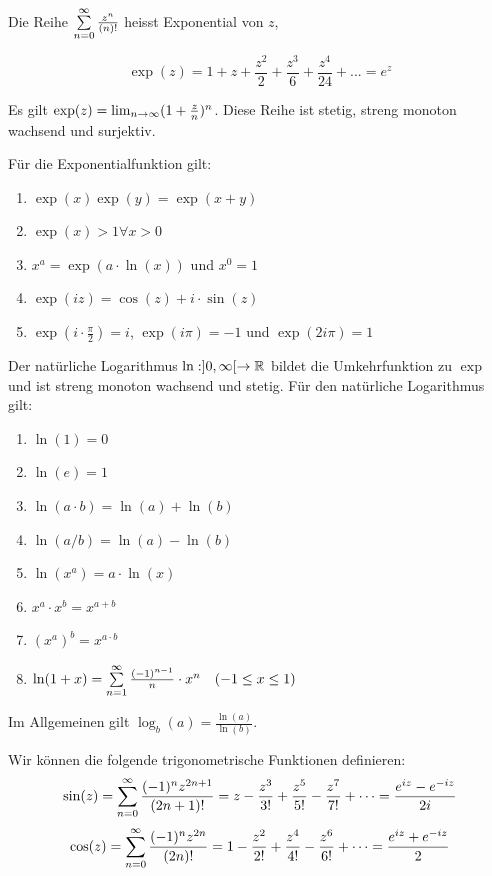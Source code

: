 \begin{tcolorbox}
	\Def Die Reihe $\sum\limits_{n=0}^\infty \frac{z^{n}}{(n)!}$ heisst Exponential von $z$,
	
	$$ \exp(z) = 1 + z + \frac{z^2}{2} + \frac{z^3}{6} + \frac{z^4}{24}+... = e^z$$

	Es gilt $\exp(z) = \lim_{n \rightarrow \infty} (1 + \frac{z}{n})^n$. Diese Reihe ist stetig, streng monoton wachsend 
	und surjektiv.
\end{tcolorbox}


Für die Exponentialfunktion gilt:
\begin{enumerate}[label = (\arabic*)]
	\item $\exp(x) \exp(y) = \exp(x+y)$
	\item $\exp(x) > 1 \forall x > 0$
	\item $x^a = \exp(a \cdot \ln(x))$ und $x^0 = 1$
	\item $\exp(iz) = \cos(z) + i \cdot \sin(z)$
	\item $\exp(i \cdot \frac{\pi}{2}) = i$, $\exp(i \pi) = -1$ und $\exp(2 i \pi) = 1$
\end{enumerate}



Der natürliche Logarithmus $\ln : ]0, \infty[ \to \mathbb{R}$ bildet die Umkehrfunktion zu $\exp$ und ist
streng monoton wachsend und stetig. Für den natürliche Logarithmus gilt:

\begin{enumerate}[label = (\arabic*)]
	\item $\ln(1) = 0$
	\item $\ln(e) = 1$
	\item $\ln(a \cdot b) = \ln(a) + \ln(b)$
	\item $\ln(a / b) = \ln(a) - \ln(b)$
	\item $\ln(x^a) = a \cdot \ln(x)$
	\item $x^a \cdot x^b = x^{a + b}$
	\item $(x^a)^b = x^{a \cdot b}$
	\item $\ln(1 + x) = \sum\limits_{n = 1}^{\infty} \frac{(-1)^{n-1}}{n} \cdot x^n \quad (-1 \leq x \leq 1)$
\end{enumerate}

Im Allgemeinen gilt $\log_b(a) = \frac{\ln(a)}{\ln(b)}$.



\Def Wir können die folgende trigonometrische Funktionen definieren:
$$\sin(z) = \sum\limits_{n=0}^\infty \frac{(-1)^{n}z^{2n+1}}{(2n+1)!} = z-\frac{z^3}{3!}+\frac{z^5}{5!}-\frac{z^7}{7!}+\dots = \frac{e^{iz} - e^{-iz}}{2i}$$
$$\cos(z) = \sum\limits_{n=0}^\infty \frac{(-1)^{n}z^{2n}}{(2n)!} = 1-\frac{z^2}{2!}+\frac{z^4}{4!}-\frac{z^6}{6!}+\dots = \frac{e^{iz} + e^{-iz}}{2}$$


